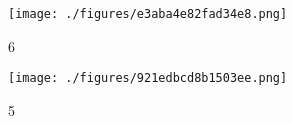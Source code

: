 


\begin{figure}[ht]
\centering
\texttt{[image: ./figures/e3aba4e82fad34e8.png]}
\caption{6} \label{fig_test3_2}
\end{figure}


\begin{figure}[ht]
\centering
\texttt{[image: ./figures/921edbcd8b1503ee.png]}
\caption{5} \label{fig_test3_3}
\end{figure}

